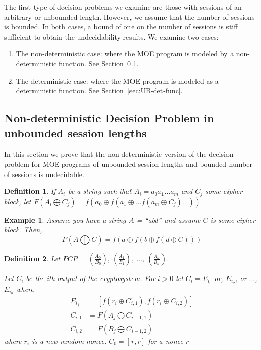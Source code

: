 \documentclass{easychair}
\newtheorem{definition}{Definition}
\newtheorem{example}{Example}
\begin{document}
The first type of decision problems we examine are those 
with sessions of an arbitrary or unbounded length. However,
we assume that the number of sessions is bounded. In both
cases, a bound of one on the number of sessions is stiff
sufficient to obtain the undecidability results. We examine two cases:
\begin{enumerate}
	\item The non-deterministic case: where the MOE program is modeled by a non-deterministic function. 
	See Section~\ref{sec:UB-non-det-func}.
	\item The deterministic case: where the MOE program is
	modeled as a deterministic function. 
	See Section~\ref{sec:UB-det-func}.
\end{enumerate}

\subsection{Non-deterministic Decision Problem in unbounded session lengths}\label{sec:UB-non-det-func}

In this section we prove that the non-deterministic version 
of the decision problem for MOE programs of 
unbounded session lengths and bounded number of sessions is undecidable.

\begin{definition}
If $A_i$ be a string such that $A_i = a_0 a_1\ldots a_m$ and 
$C_j$ some cipher block, let $F(A_i \bigoplus C_j) =
f(a_0 \oplus f(a_1 \oplus \ldots f(a_m \oplus C_j) \ldots ))$
\end{definition}

\begin{example}
Assume you have a string A = ``abd'' and assume $C$ is some cipher
block. Then, 
\[F(A \bigoplus C) = 
f(a \oplus f(b \oplus f(d \oplus C)))
\]
\end{example}



\begin{definition}\label{non-det-func}
Let $PCP = ~(\frac{A_0}{B_0}), ~(\frac{A_1}{B_1}), ~\ldots, ~(\frac{A_n}{B_n})$. 	
	
Let $C_i$ be the ith output of the cryptosystem. 
For $i > 0$ let $C_i = E_{i_0}$ or, $E_{i_2}$, or $\ldots$,
$E_{i_n}$ where 
\begin{align*}
	E_{i_j} &= [f(r_i \oplus C_{i, 1}), f(r_i \oplus C_{i,2}) ] \\
	C_{i,1} &= F(A_j \bigoplus C_{i-1, 1})	\\
	C_{i,2} &= F(B_j \bigoplus C_{i-1, 2}) 
\end{align*}
where $r_i$ is a new random nonce.
$C_0 = [r,r]$ for a nonce $r$
\end{definition}
\end{document}
